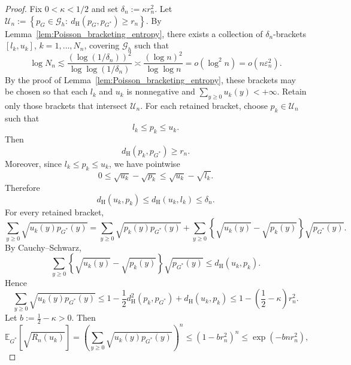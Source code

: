 \documentclass[twoside,12pt]{article}
\newcommand{\E}{\mathds{E}}
\begin{document}
\begin{proof}
Fix $0<\kappa<1/2$ and set $\delta_n:=\kappa r_n^2$. Let $\mathcal U_n:=\left\{p_G\in\mathcal G_h:\ d_{\mathrm H}(p_G,p_{G^\ast})\ge r_n\right\}$. By Lemma~\ref{lem:Poisson_bracketing_entropy}, there exists a collection of
$\delta_n$-brackets $[l_k,u_k]$, $k=1,\dots,N_n$, covering $\mathcal G_h$ such that
\begin{displaymath}
\log N_n
\lesssim
\frac{(\log(1/\delta_n))^2}{\log\log(1/\delta_n)}\asymp\frac{(\log n)^2}{\log\log n}=o(\log^2 n)=o(n\varepsilon_n^2).
\end{displaymath}
By the proof of Lemma~\ref{lem:Poisson_bracketing_entropy}, these brackets may be chosen so that each $l_k$ and $u_k$ is nonnegative and $\sum_{y\ge 0}u_k(y)<+\infty$. Retain only those brackets that intersect $\mathcal U_n$. For each retained bracket, choose
$p_k\in\mathcal U_n$ such that
\begin{displaymath}
l_k\le p_k\le u_k.
\end{displaymath}
Then
\begin{displaymath}
d_{\mathrm H}(p_k,p_{G^\ast})\ge r_n.
\end{displaymath}
Moreover, since $l_k\le p_k\le u_k$, we have pointwise
\begin{displaymath}
0\le \sqrt{u_k}-\sqrt{p_k}\le \sqrt{u_k}-\sqrt{l_k}.
\end{displaymath}
Therefore
\begin{displaymath}
d_{\mathrm H}(u_k,p_k)\le d_{\mathrm H}(u_k,l_k)\le \delta_n.
\end{displaymath}
For every retained bracket,
\begin{displaymath}
\sum_{y\ge 0}\sqrt{u_k(y)p_{G^\ast}(y)}=\sum_{y\ge 0}\sqrt{p_k(y)p_{G^\ast}(y)}+\sum_{y\ge 0}\left\{\sqrt{u_k(y)}-\sqrt{p_k(y)}\right\}\sqrt{p_{G^\ast}(y)}.
\end{displaymath}
By Cauchy--Schwarz,
\begin{displaymath}
\sum_{y\ge 0}\left\{\sqrt{u_k(y)}-\sqrt{p_k(y)}\right\}\sqrt{p_{G^\ast}(y)}\le d_{\mathrm H}(u_k,p_k).
\end{displaymath}
Hence
\begin{displaymath}
\sum_{y\ge 0}\sqrt{u_k(y)p_{G^\ast}(y)}\le 1-\frac{1}{2}d_{\mathrm H}^2(p_k,p_{G^\ast})+d_{\mathrm H}(u_k,p_k)\le 1-\left(\frac{1}{2}-\kappa\right)r_n^2.
\end{displaymath}
Let $b:=\frac{1}{2}-\kappa>0$. Then
\begin{displaymath}
\E_{G^\ast}\!\left[\sqrt{R_n(u_k)}\right]=\left(\sum_{y\ge 0}\sqrt{u_k(y)p_{G^\ast}(y)}\right)^n\le(1-br_n^2)^n\le\exp(-bnr_n^2),

\end{displaymath}
\end{proof}
\end{document}

